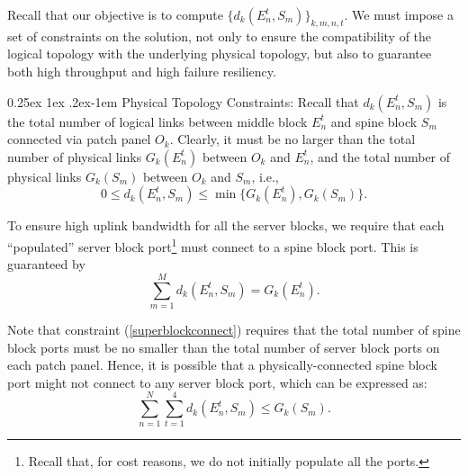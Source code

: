 \documentclass[letterpaper,twocolumn,10pt]{article}
\makeatletter
\renewcommand{\paragraph}{%
  \@startsection{paragraph}{4}%
  {\z@}{0.25ex \@plus 1ex \@minus .2ex}{-1em}%
  {\normalfont\normalsize\bfseries}%
}
\makeatother
\begin{document}
Recall that our objective is to compute $\{d_k(E_n^t, S_m)\}_{k,m,n,t}$.  We must impose a set of constraints on the solution, not only to ensure the compatibility of the logical topology with the underlying physical topology, but also to guarantee both high throughput and high failure resiliency.


\paragraph{Physical Topology Constraints:}
Recall that $d_k(E_n^t, S_m)$ is the total number of logical links between middle block $E_n^t$ and spine block $S_m$ connected via patch panel $O_k$. Clearly, it must be no larger than the total number of physical links $G_k(E_n^t)$ between $O_k$ and $E_n^t$, and the total number of physical links $G_k(S_m)$ between $O_k$ and $S_m$, i.e.,
\begin{equation}\label{blockdecisionvariables}
0\leq d_k(E_n^t, S_m)\leq\min\{G_k(E_n^t), G_k(S_m)\}.
\end{equation}

To ensure high uplink bandwidth for all the server blocks, we require that each ``populated'' server block port\footnote{Recall that, for cost reasons, we do not initially populate all the ports.} must connect to a spine block port. 
This is guaranteed by
\begin{equation}\label{superblockconnect}
\sum_{m=1}^M d_k(E_n^t, S_m)=G_k(E_n^t).
\end{equation}

Note that constraint (\ref{superblockconnect}) requires that the total number of spine block ports must be no smaller than the total number of server block ports on each patch panel. Hence, it is possible that a physically-connected spine block port might not connect to any server block port, which can be expressed as:
\begin{equation}\label{spineblockconnect}
\sum_{n=1}^N\sum_{t=1}^4 d_k(E_n^t, S_m)\leq G_k(S_m).
\end{equation}
\end{document}

